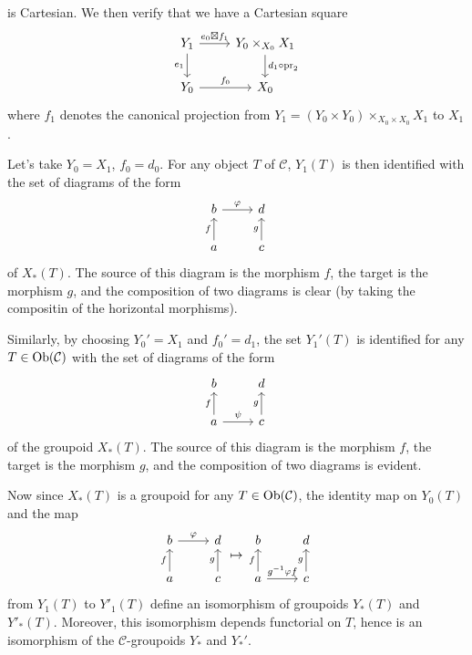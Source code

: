 is Cartesian. We then verify that we have a Cartesian square
\begin{equation}\label{category groupoid base change Y_1 square-2}
\begin{tikzcd}
Y_1\ar[r,"e_0\boxtimes f_1"]\ar[d,swap,"e_1"]&Y_0\times_{X_0}X_1\ar[d,"d_1\circ\pr_2"]\\
Y_0\ar[r,"f_0"]&X_0
\end{tikzcd}
\end{equation}
where $f_1$ denotes the canonical projection from $Y_1=(Y_0\times Y_0)\times_{X_0\times X_0}X_1$ to $X_1$.

\begin{example}\label{category groupoid base change by d_0 and d_1}
Let's take $Y_0=X_1$, $f_0=d_0$. For any object $T$ of $\mathcal{C}$, $Y_1(T)$ is then identified with the set of diagrams of the form
\[\begin{tikzcd}
b\ar[r,"\varphi"]&d\\
a\ar[u,"f"]&c\ar[u,"g"]
\end{tikzcd}\]
of $X_*(T)$. The source of this diagram is the morphism $f$, the target is the morphism $g$, and the composition of two diagrams is clear (by taking the compositin of the horizontal morphisms).\par
Similarly, by choosing $Y_0'=X_1$ and $f_0'=d_1$, the set $Y_1'(T)$ is identified for any $T\in\mathrm{Ob}(\mathcal{C})$ with the set of diagrams of the form
\[\begin{tikzcd}
b&d\\
a\ar[r,"\psi"]\ar[u,"f"]&c\ar[u,"g"]
\end{tikzcd}\]
of the groupoid $X_*(T)$. The source of this diagram is the morphism $f$, the target is the morphism $g$, and the composition of two diagrams is evident.\par
Now since $X_*(T)$ is a groupoid for any $T\in\mathrm{Ob}(\mathcal{C})$, the identity map on $Y_0(T)$ and the map
\[\begin{tikzcd}
b\ar[r,"\varphi"]&d\\
a\ar[u,"f"]&c\ar[u,"g"]
\end{tikzcd}\mapsto\begin{tikzcd}
b&d\\
a\ar[r,"g^{-1}\varphi f"]\ar[u,"f"]&c\ar[u,"g"]
\end{tikzcd}\]
from $Y_1(T)$ to $Y'_1(T)$ define an isomorphism of groupoids $Y_*(T)$ and $Y'_*(T)$. Moreover, this isomorphism depends functorial on $T$, hence is an isomorphism of the $\mathcal{C}$-groupoids $Y_*$ and $Y_*'$.
\end{example}

